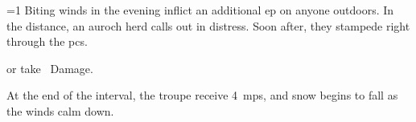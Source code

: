 
\ifnum\value{cycle}=1
  Biting winds in the evening inflict an additional \gls{ep} on anyone outdoors.
  In the distance, an auroch herd calls out in distress.
  Soon after, they stampede right through the \glspl{pc}.

  \auroch
  \addtocounter{track}{-4}

   or take ~Damage.

  At the end of the \gls{interval}, the troupe receive 4~\glspl{mp}, and \gls{snow} begins to fall as the winds calm down.
\fi

